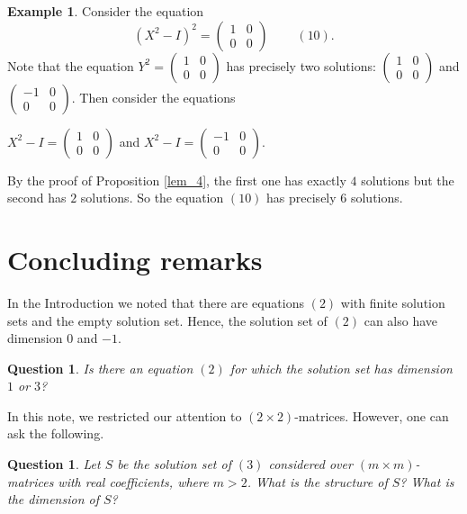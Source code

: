 \documentclass[12pt]{amsart}
\theoremstyle{plain}
\newtheorem{question}[thm]{Question}
\theoremstyle{definition}
\newtheorem{example}[thm]{Example}
\begin{document}
\begin{example} Consider the equation $$(X^2-I)^2 =\left(\begin{array}{rr}  1 & 0 \\ 0 & 0  \end{array}\right) \ \ \ \ \ \ \ \ \ \ (10).$$ Note that the equation $Y^2 = \left(\begin{array}{rr}  1 & 0 \\ 0 & 0  \end{array}\right)$
has precisely two solutions:  $\left(\begin{array}{rr}  1 & 0 \\ 0 & 0  \end{array}\right)$ and 
$\left(\begin{array}{rr}  -1 & 0 \\ 0 & 0  \end{array}\right).$  
Then consider the equations 

$X^2 - I = \left(\begin{array}{rr}  1 & 0 \\ 0 & 0  \end{array}\right)$ and $X^2 - I = \left(\begin{array}{rr}  -1 & 0 \\ 0 & 0  \end{array}\right)$.

By the proof of Proposition \ref{lem_4}, the first one has exactly $4$ solutions but the second has $2$ solutions.
So the equation $(10)$ has precisely $6$ solutions.
\end{example}


\section{Concluding remarks}

In the Introduction  we noted that there are equations $(2)$ with finite solution sets and the empty
solution set.
Hence, the solution set of $(2)$ can also have dimension $0$ and $-1$.



\begin{question} Is there an equation $(2)$ for which the solution set has dimension $1$ or $3$?
\end{question} 

In this note, we restricted our attention to $(2\times 2)$-matrices. However, one can ask the following.

\begin{question} Let $S$ be the solution set of $(3)$ considered over $(m\times m)$-matrices with real coefficients, where $m>2$. What is the structure of $S$? What is the dimension of $S$?
\end{question} 
\end{document}

